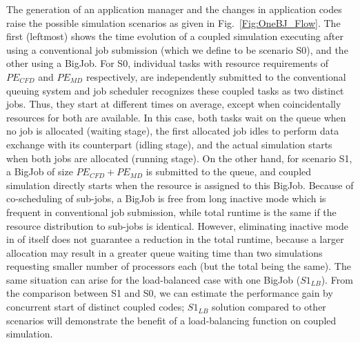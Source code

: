 \documentclass[preprint,12pt]{elsarticle}
\begin{document}
The generation of an application manager and the changes in application codes raise the possible simulation scenarios as given in Fig.~\ref{Fig:OneBJ_Flow}. The first (leftmost) shows the time evolution of a coupled simulation executing after using a conventional job submission (which we define to be scenario S0), and the other using a BigJob. For S0, individual tasks with resource requirements of $PE_{CFD}$ and $PE_{MD}$ respectively, are independently submitted to the conventional queuing system and job scheduler recognizes these coupled tasks as two distinct jobs. Thus, they start at different times on average, except when coincidentally resources for both are available. In this case, both tasks wait on the queue when no job is allocated (waiting stage), the first allocated job idles to perform data exchange with its counterpart (idling stage), and the actual simulation starts when both jobs are allocated (running stage). On the other hand, for scenario S1, a BigJob of size $PE_{CFD}+PE_{MD}$ is submitted to the queue, and coupled simulation directly starts when the resource is assigned to this BigJob. Because of co-scheduling of sub-jobs, a BigJob is free from long inactive mode which is frequent in conventional job submission, while total runtime is the same if the resource distribution to sub-jobs is identical. However, eliminating inactive mode in of itself does not guarantee a reduction in the total runtime, because a larger allocation may result in a greater queue waiting time than two simulations requesting smaller number of processors each (but the total being the same). The same situation can arise for the load-balanced case with one BigJob ($S1_{LB}$). From the comparison between S1 and S0, we can estimate the performance gain by concurrent start of distinct coupled codes; $S1_{LB}$ solution compared to other scenarios will demonstrate the benefit of a load-balancing function on coupled simulation.
\end{document}
